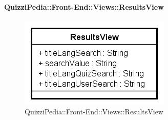 \paragraph{QuizziPedia::Front-End::Views::ResultsView}
\begin{figure} [ht]
	\centering
	\includegraphics[scale=0.80]{UML/Classi/Front-End/QuizziPedia_Front-end_Views_ResultsView.png}
	\caption{QuizziPedia::Front-End::Views::ResultsView}
\end{figure} \FloatBarrier
